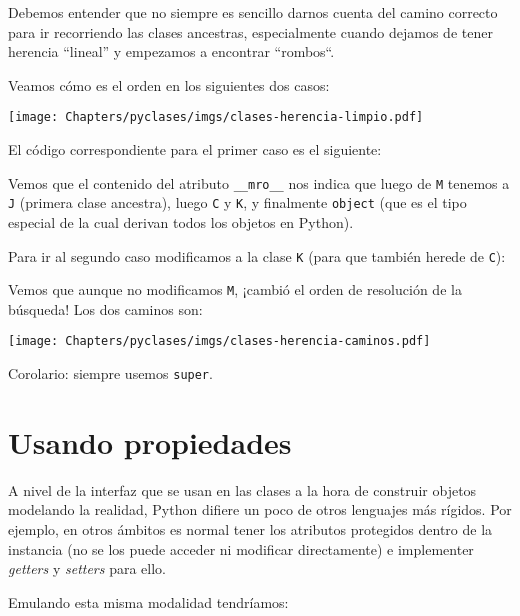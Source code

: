 Debemos entender que no siempre es sencillo darnos cuenta del camino correcto para ir recorriendo las clases ancestras, especialmente cuando dejamos de tener herencia ``lineal'' y empezamos a encontrar ``rombos``. 

Veamos cómo es el orden en los siguientes dos casos:

\begin{center}
    \texttt{[image: Chapters/pyclases/imgs/clases-herencia-limpio.pdf]}
\end{center}

El código correspondiente para el primer caso es el siguiente:


Vemos que el contenido del atributo \texttt{\_\_mro\_\_} nos indica que luego de \texttt{M} tenemos a \texttt{J} (primera clase ancestra), luego \texttt{C} y \texttt{K}, y finalmente \texttt{object} (que es el tipo especial de la cual derivan todos los objetos en Python).

Para ir al segundo caso modificamos a la clase \texttt{K} (para que también herede de \texttt{C}):


Vemos que aunque no modificamos \texttt{M}, ¡cambió el orden de resolución de la búsqueda! Los dos caminos son:

\begin{center}
    \texttt{[image: Chapters/pyclases/imgs/clases-herencia-caminos.pdf]}
\end{center}

Corolario: siempre usemos \texttt{super}.


\section{Usando propiedades}

A nivel de la interfaz que se usan en las clases a la hora de construir objetos modelando la realidad, Python difiere un poco de otros lenguajes más rígidos. Por ejemplo, en otros ámbitos es normal tener los atributos protegidos dentro de la instancia (no se los puede acceder ni modificar directamente) e implementer \textit{getters} y \textit{setters} para ello.

Emulando esta misma modalidad tendríamos:


